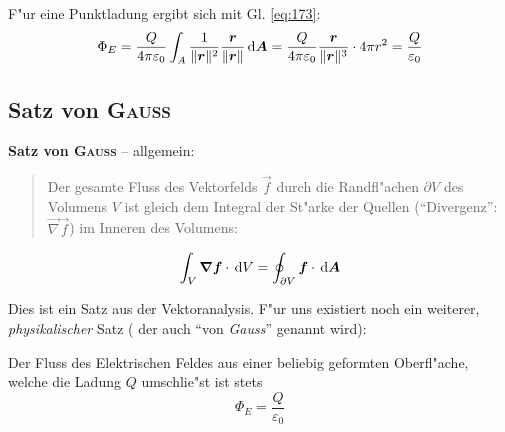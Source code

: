 
F"ur eine Punktladung ergibt sich mit Gl. \eqref{eq:173}:
\begin{equation}
   \label{eq:195}
   \Phi_E = \frac{Q}{4\pi\varepsilon_0} \int_A \frac{1}{\|\boldsymbol{r}\|^2} \frac{\boldsymbol{r}}{\|\boldsymbol{r}\|}
   \, \mathrm{d} \boldsymbol{A} =
\frac{Q}{4\pi\varepsilon_0}  \frac{\boldsymbol{r}}{\|\boldsymbol{r}\|^3} \cdot 4\pi r^2 =
\frac{Q}{\varepsilon_0}
\end{equation}





\subsection{Satz von \textsc{Gauss}}
\label{kap_satz-von-gauss}



\textbf{   Satz von \textsc{Gauss}} --
allgemein:
\begin{quote}
Der gesamte Fluss des Vektorfelds $\vec f$ durch die Randfl"achen $\partial V$
des Volumens $V$ ist gleich dem Integral der St"arke der Quellen ("`Divergenz"':
$\vec \nabla\vec f$) im Inneren des Volumens:
\end{quote}

   \begin{equation}
      \label{eqn_gauss-allgemein}
\int_V \boldsymbol{\nabla} \boldsymbol{f} \cdot \, \mathrm{d} V = \oint_{\partial V} \boldsymbol{f}
\cdot \, \mathrm{d} \boldsymbol{A}
   \end{equation}

Dies ist ein Satz aus der Vektoranalysis. F"ur uns existiert noch ein
weiterer, \emph{physikalischer} Satz ( der auch "`von \emph{Gauss}"'
genannt wird):

\begin{Wichtig}
Der Fluss des Elektrischen Feldes aus einer beliebig geformten
Oberfl"ache, welche die Ladung $Q$ umschlie"st ist stets
\begin{equation}
   \label{eqn_gauss-elektro}
{
   \Phi_E = \frac{Q}{\varepsilon_0}
}
\end{equation}
\end{Wichtig}







